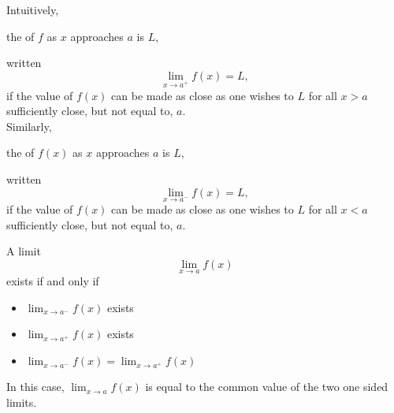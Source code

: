 \documentclass[10pt,t,presentation,ignorenonframetext,aspectratio=169]{beamer}
\begin{document}
\begin{frame}
  \vs
  \begin{definition}
    Intuitively,
    \begin{center}
      the  of $f$ as $x$ approaches $a$ is
      $L$,
    \end{center}
    written
    \[
      \lim_{x\to a^+} f(x) = L,
    \]
    if the value of $f(x)$ can be made as close as one wishes to $L$ for
    all $x>a$ sufficiently close, but not equal to, $a$.\\

    Similarly,
    \begin{center}
      the  of $f(x)$ as $x$ approaches $a$ is
      $L$,
    \end{center}
    written
    \[
      \lim_{x\to a^-} f(x) = L,
    \]
    if the value of $f(x)$ can be made as close as one wishes to $L$ for
    all $x<a$ sufficiently close, but not equal to, $a$.
  \end{definition}
\end{frame}

\begin{frame}
  \vs
  \begin{theorem}
    A limit
    \[
      \lim_{x \to a} f(x)
    \]
    exists if and only if
    \begin{itemize}
    \item $\lim_{x \to a^-} f(x)$ exists
    \item $\lim_{x \to a^+} f(x)$ exists
    \item $\lim_{x \to a^-} f(x) = \lim_{x \to a^+} f(x)$
    \end{itemize}
    In this case, $\lim_{x \to a} f(x)$ is equal to the common
    value of the two one sided limits.
  \end{theorem}
\end{frame}
\end{document}
